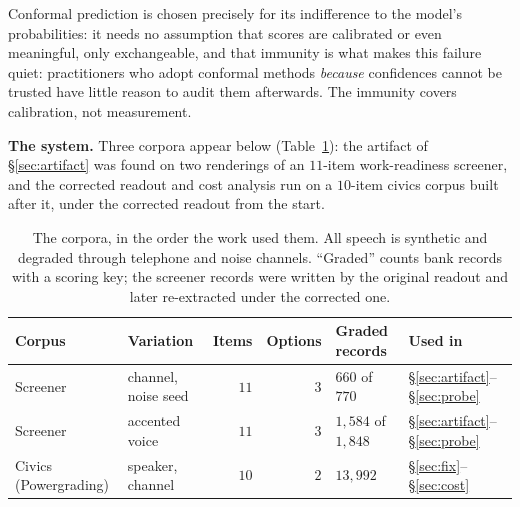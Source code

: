 \documentclass{article}
\begin{document}
Conformal prediction is chosen precisely for its indifference to the model's probabilities: it needs no assumption that scores are calibrated or even meaningful, only exchangeable, and that immunity is what makes this failure
quiet: practitioners who adopt conformal methods \emph{because} confidences cannot
be trusted have little reason to audit them afterwards. The immunity covers
calibration, not measurement.

\textbf{The system.} Three corpora appear below (Table~\ref{tab:corpora}): the
artifact of \S\ref{sec:artifact} was found on two renderings of an $11$-item
work-readiness screener, and the corrected readout and cost analysis run on a
$10$-item civics corpus built after it, under the corrected readout from the start.

\begin{table}[t]
\caption{The corpora, in the order the work used them. All speech is
synthetic and degraded through telephone and noise channels. ``Graded'' counts
bank records with a scoring key; the screener records were written by the
original readout and later re-extracted under the corrected one.}\label{tab:corpora}
\centering\small
\begin{tabular}{llrrll}
\toprule
Corpus & Variation & Items & Options & Graded records & Used in \\
\midrule
Screener & channel, noise seed & $11$ & $3$ & $660$ of $770$ & \S\ref{sec:artifact}--\S\ref{sec:probe} \\
Screener & accented voice & $11$ & $3$ & $1{,}584$ of $1{,}848$ & \S\ref{sec:artifact}--\S\ref{sec:probe} \\
Civics (Powergrading) & speaker, channel & $10$ & $2$ & $13{,}992$ & \S\ref{sec:fix}--\S\ref{sec:cost} \\
\bottomrule
\end{tabular}
\end{table}
\end{document}

